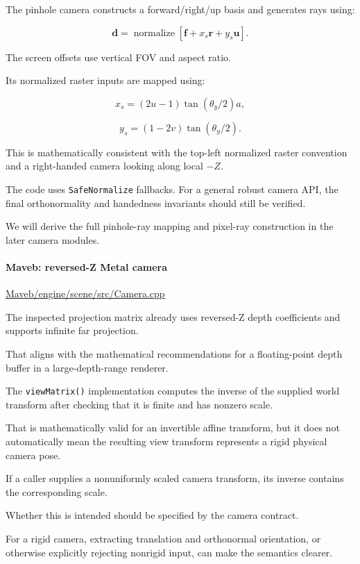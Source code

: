 The pinhole camera constructs a forward/right/up basis and generates rays using:

\[
 \boxed{ \mathbf d= \operatorname{normalize} \left[ \mathbf f+ x_s\mathbf r+ y_s\mathbf u \right] }.
\]

The screen offsets use vertical FOV and aspect ratio.

Its normalized raster inputs are mapped using:

\[
 x_s=(2u-1)\tan(\theta_y/2)a,
\]

\[
 y_s=(1-2v)\tan(\theta_y/2).
\]

This is mathematically consistent with the top-left normalized raster convention and a right-handed camera looking along local \(-Z\).

The code uses \texttt{SafeNormalize} fallbacks. For a general robust camera API, the final orthonormality and handedness invariants should still be verified.

We will derive the full pinhole-ray mapping and pixel-ray construction in the later camera modules.

\paragraph{Maveb: reversed-Z Metal camera}\label{maveb-reversed-z-metal-camera}

\href{https://github.com/swayam8624/Maveb/blob/main/engine/scene/src/Camera.cpp?utm_source=chatgpt.com}{Maveb/engine/scene/src/Camera.cpp}

The inspected projection matrix already uses reversed-Z depth coefficients and supports infinite far projection.

That aligns with the mathematical recommendations for a floating-point depth buffer in a large-depth-range renderer.

The \texttt{viewMatrix()} implementation computes the inverse of the supplied world transform after checking that it is finite and has nonzero scale.

That is mathematically valid for an invertible affine transform, but it does not automatically mean the resulting view transform represents a rigid physical camera pose.

If a caller supplies a nonuniformly scaled camera transform, its inverse contains the corresponding scale.

Whether this is intended should be specified by the camera contract.

For a rigid camera, extracting translation and orthonormal orientation, or otherwise explicitly rejecting nonrigid input, can make the semantics clearer.

